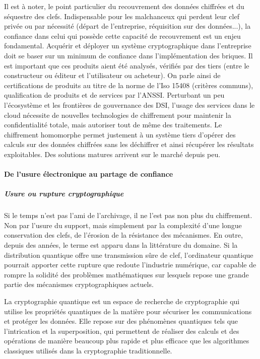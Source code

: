 
Il est à noter, le point particulier du recouvrement des données chiffrées et du séquestre des clefs. Indispensable pour les malchanceux qui perdent leur clef privée ou par nécessité (départ de l'entreprise, réquisition sur des données...), la confiance dans celui qui possède cette capacité de recouvrement est un enjeu fondamental.
Acquérir et déployer un système cryptographique dans l'entreprise doit se baser sur un minimum de confiance dans
l'implémentation des briques. Il est important que ces produits aient été analysés, vérifiés par des tiers (entre le constructeur ou éditeur et l'utilisateur ou acheteur). On parle ainsi de certifications de produits au titre de la norme de l'Iso 15408 (critères communs), qualification de produits et de services par l'ANSSI. Perturbant un peu l'écosystème et les frontières de gouvernance des DSI, l'usage des services dans le cloud nécessite de nouvelles technologies de chiffrement pour maintenir la confidentialité totale, mais autoriser tout de même des traitements. Le chiffrement homomorphe permet justement à un système tiers d'opérer des calculs sur des données chiffrées sans les déchiffrer et ainsi récupérer les résultats exploitables. Des solutions matures arrivent sur le marché depuis peu.


\paragraph{De l'usure électronique au partage de confiance}

\subparagraph{Usure ou rupture cryptographique}
Si le temps n'est pas l'ami de l'archivage, il ne l'est pas non plus du chiffrement. Non par l'usure du support, mais simplement par la complexité d'une longue conservation des clefs, de l'érosion de la résistance des mécanismes. En outre, depuis des années, le terme  est apparu dans la littérature du domaine. Si la distribution quantique offre une transmission sûre de clef, l'ordinateur quantique pourrait apporter cette rupture que redoute l'industrie numérique, car capable de rompre la solidité des problèmes mathématiques sur lesquels repose une grande partie des mécanismes cryptographiques actuels.

La cryptographie quantique est un espace de recherche de cryptographie qui utilise les propriétés quantiques de la matière pour sécuriser les communications et protéger les données. Elle repose sur des phénomènes quantiques tels que l'intrication et la superposition, qui permettent de réaliser des calculs et des opérations de manière beaucoup plus rapide et plus efficace que les algorithmes classiques utilisés dans la cryptographie traditionnelle.

